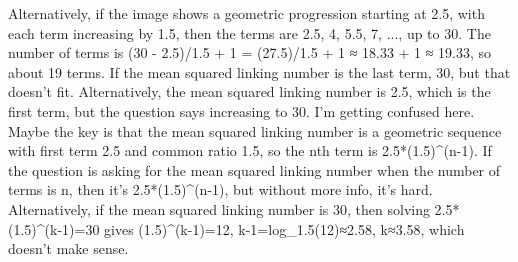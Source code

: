 Alternatively, if the image shows a geometric progression starting at 2.5, with each term increasing by 1.5, then the terms are 2.5, 4, 5.5, 7, ..., up to 30. The number of terms is (30 - 2.5)/1.5 + 1 = (27.5)/1.5 + 1 ≈ 18.33 + 1 ≈ 19.33, so about 19 terms. If the mean squared linking number is the last term, 30, but that doesn't fit. Alternatively, the mean squared linking number is 2.5, which is the first term, but the question says increasing to 30. I'm getting confused here. Maybe the key is that the mean squared linking number is a geometric sequence with first term 2.5 and common ratio 1.5, so the nth term is 2.5*(1.5)^(n-1). If the question is asking for the mean squared linking number when the number of terms is n, then it's 2.5*(1.5)^(n-1), but without more info, it's hard. Alternatively, if the mean squared linking number is 30, then solving 2.5*(1.5)^(k-1)=30 gives (1.5)^(k-1)=12, k-1=log_1.5(12)≈2.58, k≈3.58, which doesn't make sense.

